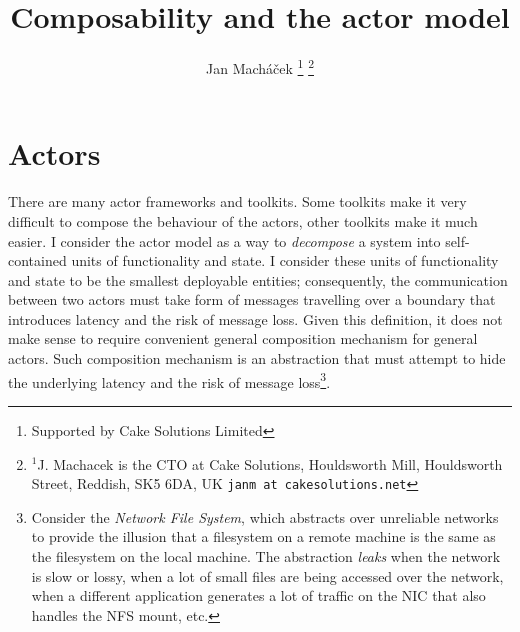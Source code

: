 



\title{Composability and the actor model}

\author{Jan Mach{\'a}\v{c}ek%
\thanks{Supported by Cake Solutions Limited}%
\thanks{$^{1}$J. Machacek is the CTO at Cake Solutions, Houldsworth Mill, Houldsworth Street, Reddish, SK5 6DA, UK {\tt\small janm at cakesolutions.net}}%
}



\twocolumn[
  \begin{@twocolumnfalse}
    \maketitle
    \begin{abstract}
      
    \end{abstract}
  \end{@twocolumnfalse}
]

\section{Actors}
There are many actor frameworks and toolkits\cite{akka,scalaz8,transient,thespian}. Some toolkits make it very difficult to compose the behaviour of the actors\cite{akka,thespian}, other toolkits make it much easier\cite{scalaz8,transient}. I consider the actor model as a way to \emph{decompose} a system into self-contained units of functionality and state. I consider these units of functionality and state to be the smallest deployable entities; consequently, the communication between two actors must take form of messages travelling over a boundary that introduces latency and the risk of message loss. Given this definition, it does not make sense to require convenient general composition mechanism for general actors. Such composition mechanism is an abstraction that must attempt to hide the underlying latency and the risk of message loss\footnote{Consider the \emph{Network File System}, which abstracts over unreliable networks to provide the illusion that a filesystem on a remote machine is the same as the filesystem on the local machine. The abstraction \emph{leaks} when the network is slow or lossy, when a lot of small files are being accessed over the network, when a different application generates a lot of traffic on the NIC that also handles the NFS mount, etc.}. 

